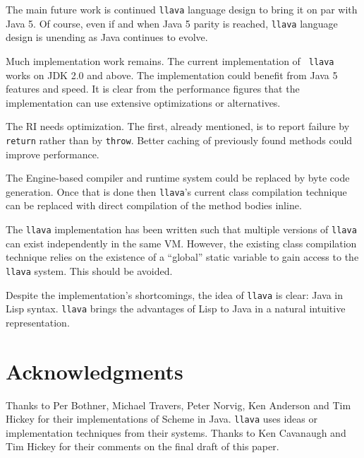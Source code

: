 \documentclass{acm_proc_article-sp}
\begin{document}
The main future work is continued {\tt llava} language design to bring
it on par with Java 5.  Of course, even if and when Java 5 parity is
reached, {\tt llava} language design is unending as Java continues to
evolve.

Much implementation work remains.  The current implementation of {\tt
llava} works on JDK 2.0 and above.  The implementation could benefit
from Java 5 features and speed.  It is clear from the performance
figures that the implementation can use extensive optimizations or
alternatives.

The RI needs optimization.  The first, already mentioned, is to report
failure by {\tt return} rather than by {\tt throw}.  Better caching of
previously found methods could improve performance.

The Engine-based compiler and runtime system could be replaced by byte
code generation.  Once that is done then {\tt llava}'s current class
compilation technique can be replaced with direct compilation of the
method bodies inline.

The {\tt llava} implementation has been written such
that multiple versions of {\tt llava} can exist independently in the
same VM.  However, the existing class compilation technique relies on the
existence of a ``global'' static variable to gain access to the {\tt
llava} system.  This should be avoided.

Despite the implementation's shortcomings, the idea of {\tt llava} is
clear: Java in Lisp syntax.  {\tt llava} brings the advantages of Lisp
to Java in a natural intuitive representation.


\section{Acknowledgments}

Thanks to Per Bothner, Michael Travers, Peter Norvig, Ken Anderson and
Tim Hickey for their implementations of Scheme in Java.  {\tt llava}
uses ideas or implementation techniques from their systems.  Thanks to
Ken Cavanaugh and Tim Hickey for their comments on the final draft of
this paper.
\end{document}
